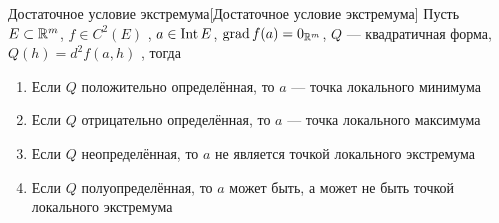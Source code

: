 \begin{teor}[https://www.youtube.com/live/oGN0SkfpZME?si=qexLykbHb05US92W&t=4191]{Достаточное условие экстремума}[Достаточное условие экстремума]
	Пусть $E \subset \mathbb R^m$, $f \in C^2(E)$ , $a \in \mathrm{Int}\, E$, $\mathrm{grad\,} f(a) = 0_{\mathbb R^m}$, $Q$ --- квадратичная форма, $Q(h) = d^2f(a, h)$ \uns{\hypersetup{linkcolor=mygray}(\ref{опр:дифференциал})}, тогда 
	\begin{enumerate}
		\item Если $Q$ положительно определённая, то $a$ --- точка локального минимума 
		
		\item Если $Q$ отрицательно определённая, то $a$ --- точка локального максимума
		
		\item Если $Q$ неопределённая, то $a$ не является точкой локального экстремума
		
		\item Если $Q$ полуопределённая, то $a$ может быть, а может не быть точкой локального экстремума
	\end{enumerate}
\end{teor}

